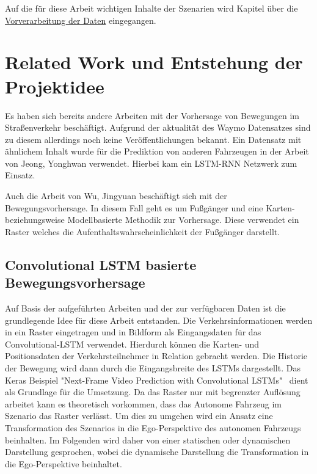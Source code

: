 \documentclass[12pt]{article}
\begin{document}
        Auf die für diese Arbeit wichtigen Inhalte der Szenarien wird Kapitel über die \hyperref[sec:preprocessing]{Vorverarbeitung der Daten} eingegangen.

\newpage

\section{Related Work und Entstehung der Projektidee}
    Es haben sich bereits andere Arbeiten mit der Vorhersage von Bewegungen im Straßenverkehr beschäftigt. 
    Aufgrund der aktualität des Waymo Datensatzes sind zu diesem allerdings noch keine Veröffentlichungen bekannt. 
    Ein Datensatz mit ähnlichem Inhalt wurde für die Prediktion von anderen Fahrzeugen in der Arbeit von Jeong, Yonghwan verwendet. 
    Hierbei kam ein LSTM-RNN Netzwerk zum Einsatz.~\cite{Yonghwan2020}
    
    Auch die Arbeit von Wu, Jingyuan beschäftigt sich mit der Bewegungsvorhersage. 
    In diesem Fall geht es um Fußgänger und eine Karten- beziehungsweise Modellbasierte Methodik zur Vorhersage. 
    Diese verwendet ein Raster welches die Aufenthaltswahrscheinlichkeit der Fußgänger darstellt.~\cite{Jingyuan2018}

    \subsection{Convolutional LSTM basierte Bewegungsvorhersage}
    Auf Basis der aufgeführten Arbeiten und der zur verfügbaren Daten ist die grundlegende Idee für diese Arbeit entstanden. 
    Die Verkehrsinformationen werden in ein Raster eingetragen und in Bildform als Eingangsdaten für das Convolutional-LSTM verwendet.
    Hierdurch können die Karten- und Positionsdaten der Verkehrsteilnehmer in Relation gebracht werden. 
    Die Historie der Bewegung wird dann durch die Eingangsbreite des LSTMs dargestellt. 
    Das Keras Beispiel "Next-Frame Video Prediction with Convolutional LSTMs"~\cite{Keras2021} dient als Grundlage für die Umsetzung.
    Da das Raster nur mit begrenzter Auflösung arbeitet kann es theoretisch vorkommen, dass das Autonome Fahrzeug 
    im Szenario das Raster verlässt. Um dies zu umgehen wird ein Ansatz eine Transformation des Szenarios in die Ego-Perspektive des autonomen Fahrzeugs beinhalten. 
    Im Folgenden wird daher von einer statischen oder dynamischen Darstellung gesprochen, wobei die dynamische Darstellung die Transformation in die Ego-Perspektive beinhaltet. 
\end{document}
